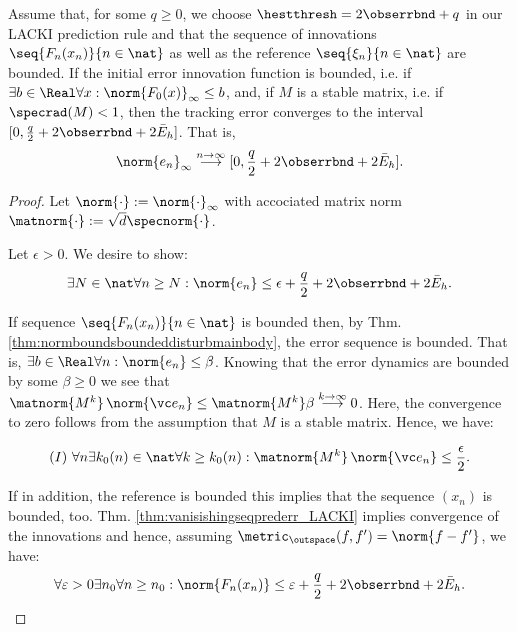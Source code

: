 \begin{thm}
Assume that, for some $q\geq0$, we choose $\hestthresh = 2 \obserrbnd + q$ in our LACKI prediction rule and that the sequence of innovations $\seq{F_n(x_n)}{n\in \nat} $ as well as the reference $\seq{\xi_n}{n \in \nat}$ are bounded. 
If the initial error innovation function is bounded, i.e. if $\exists b \in \Real \forall x: \norm{F_0(x)}_\infty \leq b $, and, if $M$ is a stable matrix, i.e. if $\specrad(M) <1$, then the tracking error converges to the interval $[0,\frac q 2 + 2  \obserrbnd  + 2 \bar E_h]$. That is,
\[\norm{e_n}_\infty \stackrel{n \to \infty}{\longrightarrow} [0,\frac q 2 + 2  \obserrbnd  + 2 \bar E_h]. \]

\end{thm}
\begin{proof} Let $\norm{\cdot} := \norm{\cdot}_\infty$ with accociated matrix norm $\matnorm{\cdot} := \sqrt{d} \specnorm{\cdot}$. 


Let $\epsilon >0$. We desire to show: 
\begin{equation}\label{}
\exists N \in \nat \forall n\geq N: \norm{e_n} \leq \epsilon+\frac q 2 + 2  \obserrbnd  +2 \bar E_h.
\end{equation}

If sequence $\seq{F_n(x_n)}{n\in \nat} $ is bounded then, by Thm. \ref{thm:normboundsboundeddisturbmainbody}, the error sequence  is bounded.  That is, $\exists b \in \Real \forall n: \norm{e_n} \leq \beta$.
Knowing that the error dynamics are bounded by some $\beta \geq 0$ we see that $\matnorm{M^{k}} \, \norm{\vc e_n} \leq \matnorm{M^{k}} \beta \stackrel{k \to \infty}{\longrightarrow} 0$. Here, the convergence to zero follows from the assumption that $M$ is a stable matrix. Hence,
we have:

$$(I)  \, \, \forall n \exists k_0(n) \in \nat \forall k \geq k_0(n): \matnorm{M^{k}} \, \norm{\vc e_n} \leq \frac\epsilon 2. $$


If in addition, the reference is bounded this implies that the sequence $(x_n)$ is bounded, too. Thm. \ref{thm:vanisishingseqprederr_LACKI} implies convergence of the innovations and hence, assuming $\metric_\outspace (f,f') = \norm{f-f'}$, we have:
\begin{equation}\label{eq:Fnconv}
\forall \varepsilon >0 \exists n_0 \forall n \geq n_0 : \norm{F_n(x_n)}\leq  \varepsilon +\frac q 2 + 2  \obserrbnd  +2 \bar E_h.
\end{equation} 



\end{proof}
